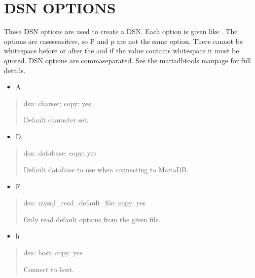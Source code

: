 \documentclass[letterpaper,10pt,english]{sphinxmanual}
\begin{document}
\section{DSN OPTIONS}
\label{\detokenize{mariadb-query-digest:dsn-options}}
\sphinxAtStartPar
These DSN options are used to create a DSN.  Each option is given like
.  The options are case\sphinxhyphen{}sensitive, so P and p are not the
same option.  There cannot be whitespace before or after the \sphinxcode{\sphinxupquote{=}} and
if the value contains whitespace it must be quoted.  DSN options are
comma\sphinxhyphen{}separated.  See the mariadb\sphinxhyphen{}tools manpage for full details.
\begin{itemize}
\item {} 
\sphinxAtStartPar
A

\end{itemize}
\begin{quote}

\sphinxAtStartPar
dsn: charset; copy: yes

\sphinxAtStartPar
Default character set.
\end{quote}
\begin{itemize}
\item {} 
\sphinxAtStartPar
D

\end{itemize}
\begin{quote}

\sphinxAtStartPar
dsn: database; copy: yes

\sphinxAtStartPar
Default database to use when connecting to MariaDB.
\end{quote}
\begin{itemize}
\item {} 
\sphinxAtStartPar
F

\end{itemize}
\begin{quote}

\sphinxAtStartPar
dsn: mysql\_read\_default\_file; copy: yes

\sphinxAtStartPar
Only read default options from the given file.
\end{quote}
\begin{itemize}
\item {} 
\sphinxAtStartPar
h

\end{itemize}
\begin{quote}

\sphinxAtStartPar
dsn: host; copy: yes

\sphinxAtStartPar
Connect to host.
\end{quote}
\end{document}
